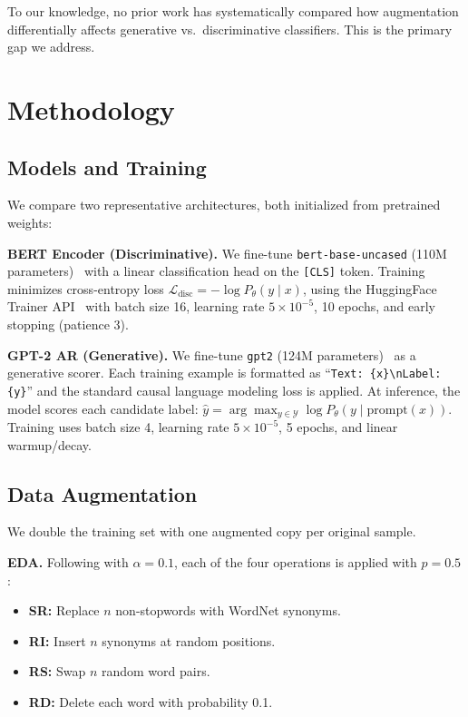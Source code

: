 \documentclass[11pt,a4paper,twocolumn]{article}
\begin{document}
To our knowledge, no prior work has systematically compared how augmentation differentially affects generative vs.\ discriminative classifiers. This is the primary gap we address.

\section{Methodology}

\subsection{Models and Training}

We compare two representative architectures, both initialized from pretrained weights:

\textbf{BERT Encoder (Discriminative).} We fine-tune \texttt{bert-base-uncased} (110M parameters)~\cite{devlin2019} with a linear classification head on the \texttt{[CLS]} token. Training minimizes cross-entropy loss $\mathcal{L}_{\text{disc}} = -\log P_\theta(y \mid x)$, using the HuggingFace Trainer API~\cite{wolf2020} with batch size 16, learning rate $5{\times}10^{-5}$, 10 epochs, and early stopping (patience 3).

\textbf{GPT-2 AR (Generative).} We fine-tune \texttt{gpt2} (124M parameters)~\cite{radford2019} as a generative scorer. Each training example is formatted as ``\texttt{Text: \{x\}\textbackslash nLabel: \{y\}}'' and the standard causal language modeling loss is applied. At inference, the model scores each candidate label: $\hat{y} = \arg\max_{y \in \mathcal{Y}} \log P_\theta(y \mid \text{prompt}(x))$. Training uses batch size 4, learning rate $5{\times}10^{-5}$, 5 epochs, and linear warmup/decay.

\subsection{Data Augmentation}

We double the training set with one augmented copy per original sample.

\textbf{EDA.} Following \cite{wei2019} with $\alpha{=}0.1$, each of the four operations is applied with $p{=}0.5$:
\begin{itemize}
    \setlength\itemsep{0pt}
    \item \textbf{SR:} Replace $n$ non-stopwords with WordNet synonyms.
    \item \textbf{RI:} Insert $n$ synonyms at random positions.
    \item \textbf{RS:} Swap $n$ random word pairs.
    \item \textbf{RD:} Delete each word with probability 0.1.
\end{itemize}
\end{document}
